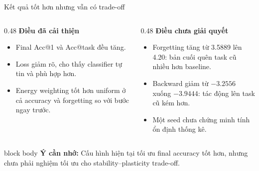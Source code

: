 \documentclass[aspectratio=169,11pt]{beamer}
\newcommand{\remember}[1]{%
  \vfill
  \begin{beamercolorbox}[wd=\textwidth,sep=0.22cm,rounded=true]{block body}
    \textbf{Ý cần nhớ:} #1
  \end{beamercolorbox}
}
\begin{document}
\begin{frame}{Kết quả tốt hơn nhưng vẫn có trade-off}
  \begin{columns}[T,onlytextwidth]
    \begin{column}{0.48\textwidth}
      {\large\bfseries Điều đã cải thiện}\par\vspace{0.25cm}
      \begin{itemize}\setlength\itemsep{0.3cm}
        \item Final Acc@1 và Acc@task đều tăng.
        \item Loss giảm rõ, cho thấy classifier tự tin và phù hợp hơn.
        \item Energy weighting tốt hơn uniform ở cả accuracy và forgetting so với bước ngay trước.
      \end{itemize}
    \end{column}
    \begin{column}{0.48\textwidth}
      {\large\bfseries Điều chưa giải quyết}\par\vspace{0.25cm}
      \begin{itemize}\setlength\itemsep{0.3cm}
        \item Forgetting tăng từ 3.5889 lên 4.20: bản cuối quên task cũ nhiều hơn baseline.
        \item Backward giảm từ $-3.2556$ xuống $-3.9444$: tác động lên task cũ kém hơn.
        \item Một seed chưa chứng minh tính ổn định thống kê.
      \end{itemize}
    \end{column}
  \end{columns}
  \remember{Cấu hình hiện tại tối ưu final accuracy tốt hơn, nhưng chưa phải nghiệm tối ưu cho stability--plasticity trade-off.}
\end{frame}
\end{document}
